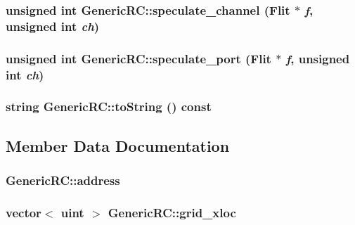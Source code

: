 \hypertarget{classGenericRC_62380900287660d9e73a80f8da7800ab}{
\subsubsection[{speculate\_\-channel}]{\setlength{\rightskip}{0pt plus 5cm}unsigned int GenericRC::speculate\_\-channel ({\bf Flit} $\ast$ {\em f}, \/  unsigned int {\em ch})}}
\label{classGenericRC_62380900287660d9e73a80f8da7800ab}


\hypertarget{classGenericRC_23666c0b23e511d1f46917023fe26b66}{
\subsubsection[{speculate\_\-port}]{\setlength{\rightskip}{0pt plus 5cm}unsigned int GenericRC::speculate\_\-port ({\bf Flit} $\ast$ {\em f}, \/  unsigned int {\em ch})}}
\label{classGenericRC_23666c0b23e511d1f46917023fe26b66}


\hypertarget{classGenericRC_214ef51af1dd900b41bb98b4826b5af4}{
\subsubsection[{toString}]{\setlength{\rightskip}{0pt plus 5cm}string GenericRC::toString () const}}
\label{classGenericRC_214ef51af1dd900b41bb98b4826b5af4}




\subsection{Member Data Documentation}
\hypertarget{classGenericRC_5a89c8b3e742b017f108ce1075422526}{
\subsubsection[{address}]{ {\bf GenericRC::address}}}
\label{classGenericRC_5a89c8b3e742b017f108ce1075422526}


\hypertarget{classGenericRC_2e2f02ddede7cfafca6073ee559663e2}{
\subsubsection[{grid\_\-xloc}]{\setlength{\rightskip}{0pt plus 5cm}vector$<$ {\bf uint} $>$ {\bf GenericRC::grid\_\-xloc}}}
\label{classGenericRC_2e2f02ddede7cfafca6073ee559663e2}


